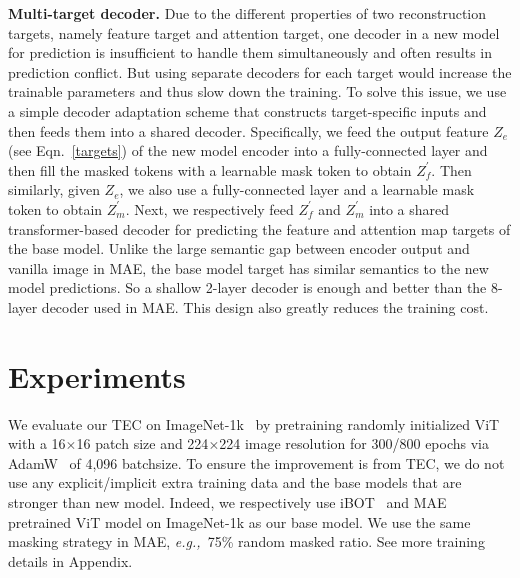 \documentclass{article} \usepackage{iclr2023_conference,times}
\newcommand{\myPara}[1]{\vspace{-.05in} \noindent\textbf{#1}}
\def\eg{\emph{e.g.,~}}
\begin{document}
\myPara{Multi-target  decoder.}
Due to the different properties of two reconstruction targets,  namely feature target and attention target,  
one decoder in a new model for prediction is insufficient to handle them simultaneously and often   results in prediction  conflict. 
But  using separate decoders for each target would increase the trainable parameters and thus slow down the training.  To solve this issue, we use a simple decoder adaptation scheme that constructs target-specific inputs and then feeds them into a shared decoder.
Specifically, we feed the output feature $Z_{e}$
(see Eqn.~\ref{targets}) of the new model encoder into a fully-connected layer and then fill the masked tokens with a learnable mask token to obtain $Z_f^{'}$.  
Then similarly, given $Z_{e}$, we also use a fully-connected layer and a learnable mask token to obtain $Z_m^{'}$. 
Next, we respectively feed $Z_f^{'}$ and $Z_m^{'}$ into a shared transformer-based decoder for predicting the feature and attention map targets of the base model.  
Unlike the large semantic gap between encoder output and vanilla image  in MAE, the base model target has similar semantics to the new model predictions. So a shallow 2-layer decoder is enough and better than the 8-layer decoder used in MAE. This design also greatly reduces the training cost.



\vspace{-5pt}
\section{Experiments}
\vspace{-10pt}
We evaluate our TEC  on ImageNet-1k~\citep{deng2009imagenet} by pretraining   randomly initialized  ViT~\citep{dosovitskiy2020image} with a 16$\times$16 patch size and 224$\times$224 image resolution for 300/800 epochs via AdamW~\citep{loshchilov2017decoupled}  of 4,096 batchsize. To ensure the improvement is from TEC, we do not use any explicit/implicit extra training data and  the base models that are stronger than new model. 
Indeed, we respectively use   iBOT~\citep{zhou2021ibot} and MAE~\citep{he2022masked} pretrained ViT model  on ImageNet-1k  as our base model. 
We use the same masking strategy in MAE, \eg  75\% random masked ratio. See more training details in Appendix.
\end{document}
